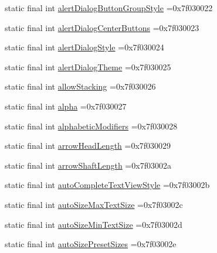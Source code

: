 \begin{DoxyCompactItemize}
\item 
static final int \mbox{\hyperlink{classbr_1_1unb_1_1cic_1_1mp_1_1marketmaster_1_1R_1_1attr_a243fba4b73a76ae8c7f38d29aa9dcb5d}{alert\+Dialog\+Button\+Group\+Style}} =0x7f030022
\item 
static final int \mbox{\hyperlink{classbr_1_1unb_1_1cic_1_1mp_1_1marketmaster_1_1R_1_1attr_a20f2cf07c7d2121149a3700f3571ceaa}{alert\+Dialog\+Center\+Buttons}} =0x7f030023
\item 
static final int \mbox{\hyperlink{classbr_1_1unb_1_1cic_1_1mp_1_1marketmaster_1_1R_1_1attr_af969fdacf414741c24a66a0a1441000e}{alert\+Dialog\+Style}} =0x7f030024
\item 
static final int \mbox{\hyperlink{classbr_1_1unb_1_1cic_1_1mp_1_1marketmaster_1_1R_1_1attr_a7b66c9749198bee5c702c52d4d9ce010}{alert\+Dialog\+Theme}} =0x7f030025
\item 
static final int \mbox{\hyperlink{classbr_1_1unb_1_1cic_1_1mp_1_1marketmaster_1_1R_1_1attr_a29667adfc3237182a098487cef45d6a7}{allow\+Stacking}} =0x7f030026
\item 
static final int \mbox{\hyperlink{classbr_1_1unb_1_1cic_1_1mp_1_1marketmaster_1_1R_1_1attr_a5916d9fb14456477d95057f0cbc110d4}{alpha}} =0x7f030027
\item 
static final int \mbox{\hyperlink{classbr_1_1unb_1_1cic_1_1mp_1_1marketmaster_1_1R_1_1attr_a4a4b55114d832616780f0da757cbfa08}{alphabetic\+Modifiers}} =0x7f030028
\item 
static final int \mbox{\hyperlink{classbr_1_1unb_1_1cic_1_1mp_1_1marketmaster_1_1R_1_1attr_a4a1cc7a3eb72f07737e68e60d0b4d4fd}{arrow\+Head\+Length}} =0x7f030029
\item 
static final int \mbox{\hyperlink{classbr_1_1unb_1_1cic_1_1mp_1_1marketmaster_1_1R_1_1attr_a417c26ef963b581536927f31f451bead}{arrow\+Shaft\+Length}} =0x7f03002a
\item 
static final int \mbox{\hyperlink{classbr_1_1unb_1_1cic_1_1mp_1_1marketmaster_1_1R_1_1attr_ad81122481bc6653d5591cfcf7b6b333b}{auto\+Complete\+Text\+View\+Style}} =0x7f03002b
\item 
static final int \mbox{\hyperlink{classbr_1_1unb_1_1cic_1_1mp_1_1marketmaster_1_1R_1_1attr_a85a158376001aee123bbfe55eb90a33f}{auto\+Size\+Max\+Text\+Size}} =0x7f03002c
\item 
static final int \mbox{\hyperlink{classbr_1_1unb_1_1cic_1_1mp_1_1marketmaster_1_1R_1_1attr_a42141b0e0651ccc59e4d64880f514c74}{auto\+Size\+Min\+Text\+Size}} =0x7f03002d
\item 
static final int \mbox{\hyperlink{classbr_1_1unb_1_1cic_1_1mp_1_1marketmaster_1_1R_1_1attr_a2bf4e99937f131ac7884511860d3cc0c}{auto\+Size\+Preset\+Sizes}} =0x7f03002e

\end{DoxyCompactItemize}
